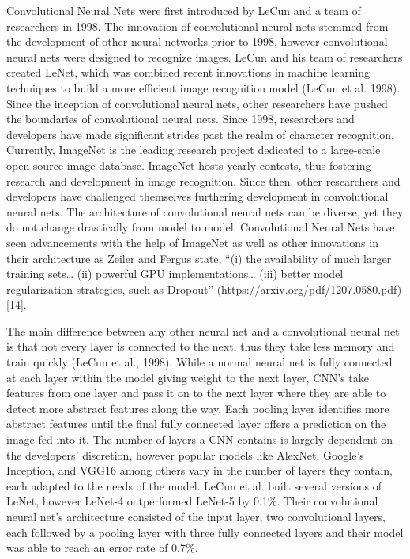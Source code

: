 \documentclass[12pt,english]{article}
\begin{document}
Convolutional Neural Nets were first introduced by LeCun and a team of researchers in 1998. The innovation of convolutional neural nets stemmed from the development of other neural networks prior to 1998, however convolutional neural nets were designed to recognize images. LeCun and his team of researchers created LeNet, which was combined recent innovations in machine learning techniques to build a more efficient image recognition model (LeCun et al. 1998). Since the inception of convolutional neural nets, other researchers have pushed the boundaries of convolutional neural nets. Since 1998, researchers and developers have made significant strides past the realm of character recognition. Currently, ImageNet is the leading research project dedicated to a large-scale open source image database. ImageNet hosts yearly contests, thus fostering research and development in image recognition. Since then, other researchers and developers have challenged themselves furthering development in convolutional neural nets. The architecture of convolutional neural nets can be diverse, yet they do not change drastically from model to model. Convolutional Neural Nets have seen advancements with the help of ImageNet as well as other innovations in their architecture as Zeiler and Fergus state, “(i) the availability of much larger training sets… (ii) powerful GPU implementations… (iii) better model regularization strategies, such as Dropout” (https://arxiv.org/pdf/1207.0580.pdf) [14]. \par

The main difference between any other neural net and a convolutional neural net is that not every layer is connected to the next, thus they take less memory and train quickly (LeCun et al., 1998). While a normal neural net is fully connected at each layer within the model giving weight to the next layer, CNN’s take features from one layer and pass it on to the next layer where they are able to detect more abstract features along the way. Each pooling layer identifies more abstract features until the final fully connected layer offers a prediction on the image fed into it. The number of layers a CNN contains is largely dependent on the developers’ discretion, however popular models like AlexNet, Google’s Inception, and VGG16 among others vary in the number of layers they contain, each adapted to the needs of the model. 
LeCun et al. built several versions of LeNet, however LeNet-4 outperformed LeNet-5 by 0.1\%. Their convolutional neural net’s architecture consisted of the input layer, two convolutional layers, each followed by a pooling layer with three fully connected layers and their model was able to reach an error rate of 0.7\%.\par
\end{document}
